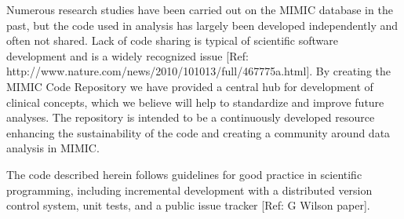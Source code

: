 \documentclass{elsart}
\begin{document}


Numerous research studies have been carried out on the MIMIC database in the past, but the code used in analysis has largely been developed independently and often not shared. Lack of code sharing is typical of scientific software development and is a widely recognized issue [Ref: http://www.nature.com/news/2010/101013/full/467775a.html]. By creating the MIMIC Code Repository we have provided a central hub for development of clinical concepts, which we believe will help to standardize and improve future analyses.
The repository is intended to be a continuously developed resource enhancing the sustainability of the code and creating a community around data analysis in MIMIC.

The code described herein follows guidelines for good practice in scientific programming, including incremental development with a distributed version control system, unit tests, and a public issue tracker [Ref: G Wilson paper].





\end{document}
